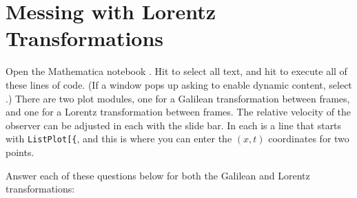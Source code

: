 \section{Messing with Lorentz Transformations}

\makelabheader %

\bigskip

Open the Mathematica notebook .  Hit  to select all text, and
hit  to execute all of these lines of code. (If a window pops up asking to enable
dynamic content, select .)  There are two plot modules, one for a Galilean transformation between frames, and one for a Lorentz transformation between frames.  The relative velocity of the observer can be adjusted in each with the slide bar.  In each is a line that starts with \verb!ListPlot[{!, and this is where you can enter the $(x,t)$ coordinates for two points.

Answer each of these questions below for both the Galilean and Lorentz transformations:

